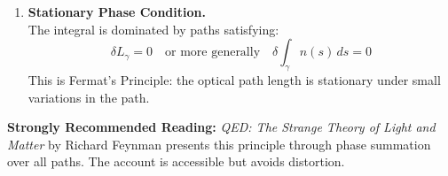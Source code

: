 {\begin{enumerate}
    \item \textbf{Stationary Phase Condition.} \\
    The integral is dominated by paths satisfying:
    \[
    \delta L_\gamma = 0 \quad \text{or more generally} \quad \delta \int_\gamma n(s) \, ds = 0
    \]
    This is Fermat’s Principle: the optical path length is stationary under small variations in the path.

\end{enumerate}

\bigskip

\noindent \textbf{Strongly Recommended Reading:} \textit{QED: The Strange Theory of Light and Matter} by Richard Feynman presents this principle through phase summation over all paths. The account is accessible but avoids distortion.
}
